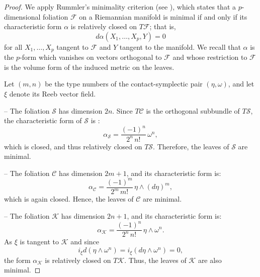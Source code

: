 \documentclass[12pt]{amsart}
\theoremstyle{definition}
\theoremstyle{remark}
\begin{document}
\begin{proof}
We apply Rummler's minimality criterion (see \cite{Rummler}), which states that a $p$-dimensional foliation $\mathcal{F}$ on a Riemannian manifold is minimal if and only if its characteristic form $\alpha$ is relatively closed on $T\mathcal{F}$; that is,
\begin{equation*}
d\alpha(X_1, \dots, X_p, Y) = 0
\end{equation*}
for all $X_1, \dots, X_p$  tangent to $\mathcal F$ and $Y$ tangent to the manifold.
We recall that $\alpha$ is the $p$-form
which vanishes on vectors orthogonal to $\mathcal F$ and whose restriction to $\mathcal F$ is the volume form of the induced metric on the leaves.

\medskip 
\noindent
Let $(m,n)$ be the type numbers of the contact-symplectic pair $(\eta, \omega)$, and let $\xi$ denote its Reeb vector field.

\medskip 
\noindent
-- The foliation $\mathcal{S}$ has dimension $2n$. Since $T\mathcal{C}$ is the orthogonal subbundle of $T\mathcal{S}$, the characteristic form of $\mathcal{S}$ is :
\begin{equation*}
\alpha_{\mathcal{S}} = \dfrac{(-1)^n}{2^n \, n!} \, \omega^n,
\end{equation*}
which is closed, and thus relatively closed on $T\mathcal{S}$. Therefore, the leaves of $\mathcal{S}$ are minimal.

\medskip 
\noindent
-- The foliation $\mathcal{C}$ has dimension $2m+1$, and its characteristic form is:
\begin{equation*}
\alpha_{\mathcal{C}} = \dfrac{(-1)^m}{2^m \, m!} \, \eta \wedge (d\eta)^m,
\end{equation*}
which is again closed. Hence, the leaves of $\mathcal{C}$ are minimal.

\medskip 
\noindent
-- The foliation $\mathcal{K}$ has dimension $2n+1$, and its characteristic form is:
\begin{equation*}
\alpha_{\mathcal{K}} =  \dfrac{(-1)^n}{2^n \, n!} \, \eta \wedge \omega^n.
\end{equation*}
As $\xi$ is tangent to $\mathcal{K}$ and since
\begin{equation*}
i_\xi d(\eta \wedge \omega^n) = i_\xi (d\eta \wedge \omega^n) = 0,
\end{equation*}
the form $\alpha_{\mathcal{K}}$ is relatively closed on $T\mathcal{K}$. Thus, the leaves of $\mathcal{K}$ are also minimal.
\end{proof}
\end{document}
